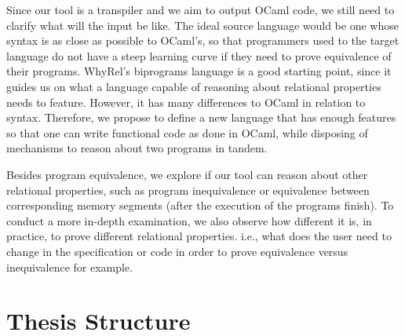 Since our tool is a transpiler and we aim to output OCaml code, we still need to clarify what will the input be like.
The ideal source language would be one whose syntax is as close as possible to OCaml's, so that programmers used to the target language do not have a steep learning curve if they need to prove equivalence of their programs. 
WhyRel's biprograms language is a good starting point, since it guides us on what a language capable of reasoning about relational properties needs to feature.
However, it has many differences to OCaml in relation to syntax.
Therefore, we propose to define a new language that has enough features so that one can write functional code as done in OCaml, while disposing of mechanisms to reason about two programs in tandem.

Besides program equivalence, we explore if our tool can reason about other relational properties, such as program inequivalence or equivalence between corresponding memory segments (after the execution of the programs finish).
To conduct a more in-depth examination, we also observe how different it is, in practice, to prove different relational properties.
i.e., what does the user need to change in the specification or code in order to prove equivalence versus inequivalence for example.


\section{Thesis Structure}

